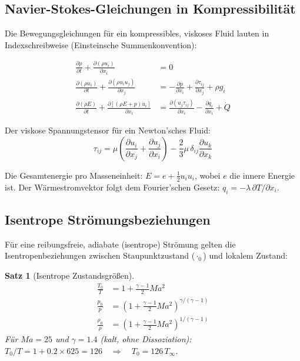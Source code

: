 ﻿\documentclass[12pt,a4paper]{article}
\newtheorem{satz}{Satz}[section]
\newcommand{\Ma}{M\!a}
\begin{document}
\subsection{Navier-Stokes-Gleichungen in Kompressibilität}

Die Bewegungsgleichungen für ein kompressibles, viskoses Fluid lauten in
Indexschreibweise (Einsteinsche Summenkonvention):

\begin{align}
  \frac{\partial \rho}{\partial t} + \frac{\partial (\rho u_i)}{\partial x_i} &= 0
  \tag{Kontinuität}\label{eq:kont}\\[4pt]
  \frac{\partial (\rho u_i)}{\partial t} + \frac{\partial (\rho u_i u_j)}{\partial x_j}
  &= -\frac{\partial p}{\partial x_i} + \frac{\partial \tau_{ij}}{\partial x_j} + \rho g_i
  \tag{Impuls}\label{eq:impuls}\\[4pt]
  \frac{\partial (\rho E)}{\partial t} + \frac{\partial [(\rho E + p)u_i]}{\partial x_i}
  &= \frac{\partial (u_j \tau_{ij})}{\partial x_i}
    - \frac{\partial q_i}{\partial x_i} + \dot{Q}
  \tag{Energie}\label{eq:energie}
\end{align}

Der viskose Spannungstensor für ein Newton'sches Fluid:
\[
  \tau_{ij} = \mu\left(\frac{\partial u_i}{\partial x_j}
    + \frac{\partial u_j}{\partial x_i}\right)
    - \frac{2}{3}\mu\,\delta_{ij}\frac{\partial u_k}{\partial x_k}
\]

Die Gesamtenergie pro Masseneinheit: $E = e + \frac{1}{2}u_i u_i$, wobei $e$ die
innere Energie ist. Der Wärmestromvektor folgt dem Fourier'schen Gesetz:
$q_i = -\lambda\,\partial T/\partial x_i$.

\subsection{Isentrope Strömungsbeziehungen}

Für eine reibungsfreie, adiabate (isentrope) Strömung gelten die
Isentropenbeziehungen zwischen Staupunktzustand ($\cdot_0$) und lokalem Zustand:

\begin{satz}[Isentrope Zustandsgrößen]
\begin{align}
  \frac{T_0}{T} &= 1 + \frac{\gamma-1}{2}\Ma^2
  \label{eq:T_isentrop}\\[4pt]
  \frac{p_0}{p} &= \left(1 + \frac{\gamma-1}{2}\Ma^2\right)^{\gamma/(\gamma-1)}
  \label{eq:p_isentrop}\\[4pt]
  \frac{\rho_0}{\rho} &= \left(1 + \frac{\gamma-1}{2}\Ma^2\right)^{1/(\gamma-1)}
  \label{eq:rho_isentrop}
\end{align}
Für $\Ma = 25$ und $\gamma = 1.4$ (kalt, ohne Dissoziation):
$T_0/T = 1 + 0.2 \times 625 = 126 \quad\Rightarrow\quad T_0 = 126\,T_\infty$.
\end{satz}
\end{document}
